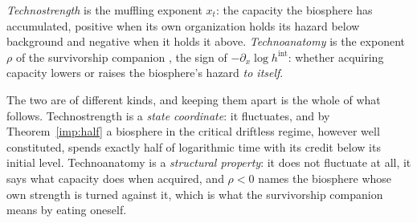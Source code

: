 \begin{definition}\label{gr:def:coords}
\emph{Technostrength} is the muffling exponent $x_t$: the capacity the
biosphere has accumulated, positive when its own organization holds its
hazard below background and negative when it holds it above.
\emph{Technoanatomy} is the exponent $\rho$ of
the survivorship companion \cite{GoldenSurvivorship}, the sign of
$-\partial_x\log h^{\mathrm{int}}$: whether acquiring capacity lowers or
raises the biosphere's hazard \emph{to itself}.

The two are of different kinds, and keeping them apart is the whole of
what follows. Technostrength is a \emph{state coordinate}: it
fluctuates, and by Theorem~\ref{imp:half} a biosphere in the
critical driftless regime, however well constituted, spends exactly half
of logarithmic time with its credit below its initial level. Technoanatomy is a \emph{structural property}: it does not
fluctuate at all, it says what capacity does when acquired, and
$\rho<0$ names the biosphere whose own strength is turned against it,
which is what the survivorship companion \cite{GoldenSurvivorship} means by eating oneself.


\end{definition}
